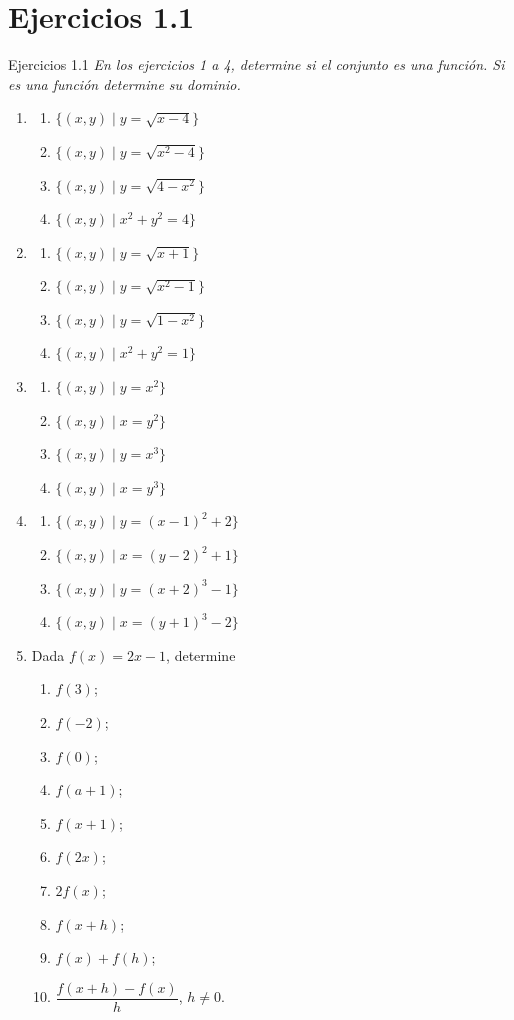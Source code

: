 \documentclass[aspectratio=169,10pt]{beamer}
\begin{document}
\section*{Ejercicios 1.1}
\begin{frame}{Ejercicios 1.1}
\textit{En los ejercicios 1 a 4, determine si el conjunto es una función. Si es una función determine su dominio.}

\begin{enumerate}
\item
\begin{enumerate}
\item $\{(x,y)\mid y=\sqrt{x-4}\}$
\item $\{(x,y)\mid y=\sqrt{x^2-4}\}$
\item $\{(x,y)\mid y=\sqrt{4-x^2}\}$
\item $\{(x,y)\mid x^2+y^2=4\}$
\end{enumerate}

\item
\begin{enumerate}
\item $\{(x,y)\mid y=\sqrt{x+1}\}$
\item $\{(x,y)\mid y=\sqrt{x^2-1}\}$
\item $\{(x,y)\mid y=\sqrt{1-x^2}\}$
\item $\{(x,y)\mid x^2+y^2=1\}$
\end{enumerate}

\item
\begin{enumerate}
\item $\{(x,y)\mid y=x^2\}$
\item $\{(x,y)\mid x=y^2\}$
\item $\{(x,y)\mid y=x^3\}$
\item $\{(x,y)\mid x=y^3\}$
\end{enumerate}

\item
\begin{enumerate}
\item $\{(x,y)\mid y=(x-1)^2+2\}$
\item $\{(x,y)\mid x=(y-2)^2+1\}$
\item $\{(x,y)\mid y=(x+2)^3-1\}$
\item $\{(x,y)\mid x=(y+1)^3-2\}$
\end{enumerate}

\item Dada $f(x)=2x-1$, determine
\begin{enumerate}
\item $f(3)$; \item $f(-2)$; \item $f(0)$; \item $f(a+1)$; \item $f(x+1)$;
\item $f(2x)$; \item $2f(x)$; \item $f(x+h)$; \item $f(x)+f(h)$;
\item $\dfrac{f(x+h)-f(x)}{h}$, $h\ne0$.
\end{enumerate}


\end{enumerate}
\end{frame}
\end{document}
